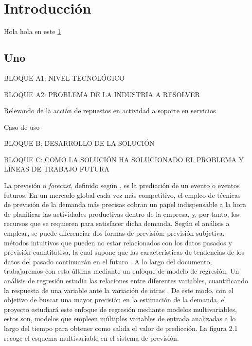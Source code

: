 \chapter{Introducción}\label{cap1}

Hola hola en este \ref{cap1}

\section{Uno}

BLOQUE A1: NIVEL TECNOLÓGICO

BLOQUE A2: PROBLEMA DE LA INDUSTRIA A RESOLVER

Relevando de la acción de repuestos en actividad a soporte en servicios

Caso de uso

BLOQUE B: DESARROLLO DE LA SOLUCIÓN

BLOQUE C: COMO LA SOLUCIÓN HA SOLUCIONADO EL PROBLEMA Y LÍNEAS DE TRABAJO FUTURA








La previsión o \textit{forecast}, definido según \cite{douglas}, es la predicción de un evento o eventos futuros. En un mercado global cada vez más competitivo, el empleo de técnicas de previsión de la demanda más precisas cobran un papel indispensable a la hora de planificar las actividades productivas dentro de la empresa, y, por tanto, los recursos que se requieren para satisfacer dicha demanda. Según el análisis a emplear, se puede diferenciar dos formas de previsión: previsión subjetiva, métodos intuitivos que pueden no estar relacionados con los datos pasados y previsión cuantitativa, la cual supone que las características de tendencias de los datos del pasado continuarán en el futuro \cite{bovas}. A lo largo del documento, trabajaremos con esta última mediante un enfoque de modelo de regresión. Un análisis de regresión estudia las relaciones entre diferentes variables, cuantificando la respuesta de una variable ante la variación de otras \cite{bovas}. De este modo, con el objetivo de buscar una mayor precisión en la estimación de la demanda, el proyecto estudiará este enfoque de regresión mediante modelos multivariables, estos son, modelos que empleen múltiples variables de entrada analizadas a lo largo del tiempo para obtener como salida el valor de predicción. La figura 2.1 recoge el esquema multivariable en el sistema de previsión.